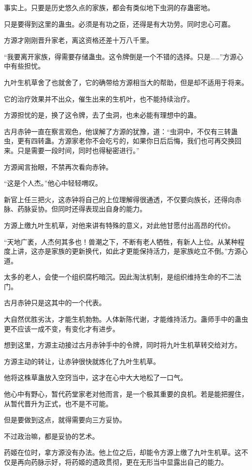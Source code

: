 \begin{this_body}
事实上。只要是历史悠久点的家族，都会有类似地下虫洞的存蛊密地。

只是要得到这里的蛊虫。必须是有功之臣，还得是有大功劳。同时忠心可嘉。

方源才刚刚晋升家老，离这资格还差十万八千里。

“我要离开家族，得需要存储蛊虫。这令牌倒是一个不错的选择。只是……”方源心中有些担忧。

九叶生机草舍了也就舍了，它的确带给方源相当大的帮助，但是却不适用于将来。

它的治疗效果并不出众，催生出来的生机叶，也不能持续治疗。

方源担忧的是，换了这令牌，去了虫洞，也未必能有理想中的蛊。

古月赤钟一直在察言观色，他误解了方源的犹豫，道：“虫洞中，不仅有三转蛊虫，更有四转蛊。方源家老你不会吃亏的，如果你日后后悔，我们也可再交换回来。只是需要一段时间，同时也得秘密进行。”

方源闻言抬眼，不禁再次看向赤钟。

“这是个人杰。”他心中轻轻喟叹。

新官上任三把火，这赤钟将自己的上位理解得很通透，不仅要向族长，还得向赤脉、药脉妥协。但同时还得表现出自身的能力。

方源上缴九叶生机草，对他来讲有特殊的意义，对此他甘愿付出高昂的代价。

“天地广袤，人杰何其多也！兽潮之下，不断有老人牺牲，有新人上位。从某种程度上讲，这亦是家族的更新换代，如此才更能保持活力，是家族屹立不倒。”方源心道。

太多的老人，会使一个组织腐朽暗沉。因此淘汰机制，是组织维持生命的不二法门。

古月赤钟只是这其中的一个代表。

大自然优胜劣汰，才能生机勃勃。人体新陈代谢，才能维持活力。蛊师手中的蛊虫更不应该一成不变，有变化才有进步。

想到这里，方源主动接过古月赤钟手中的令牌，同时将九叶生机草转交给对方。

方源主动的转让，让赤钟很快就炼化了九叶生机草。

他将这株草蛊放入空窍当中，这才在心中大大地松了一口气。

他心中有野心，暂代药堂家老对他而言，是一个极其重要的良机。若是能把握住，从暂代晋升为正式，也不是不可能。

但是要做到这点，就得需要向三方妥协。

不过政治嘛，都是妥协的艺术。

药姬在位时，拿方源没有办法。他上位之后，却能令方源上缴了九叶生机草。这不仅是再向药脉示好，将药姬的遗政贯彻，更在无形当中显露出自己的能力。


\end{this_body}
